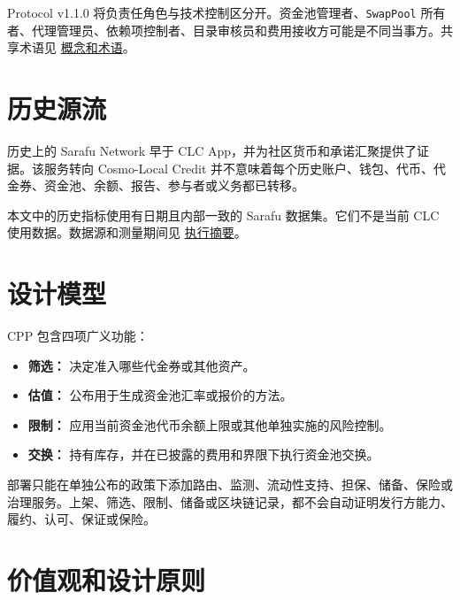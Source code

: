 \documentclass[11pt]{article}
\begin{document}
Protocol v1.1.0 将负责任角色与技术控制区分开。资金池管理者、\texttt{SwapPool} 所有者、代理管理员、依赖项控制者、目录审核员和费用接收方可能是不同当事方。共享术语见 \href{https://docs.cosmolocal.credit/zh/introduction/concepts}{概念和术语}。

\section*{历史源流}

历史上的 Sarafu Network 早于 CLC App，并为社区货币和承诺汇聚提供了证据。该服务转向 Cosmo-Local Credit 并不意味着每个历史账户、钱包、代币、代金券、资金池、余额、报告、参与者或义务都已转移。

本文中的历史指标使用有日期且内部一致的 Sarafu 数据集。它们不是当前 CLC 使用数据。数据源和测量期间见 \href{https://docs.cosmolocal.credit/zh/white-paper/executive-summary}{执行摘要}。

\section*{设计模型}

CPP 包含四项广义功能：

\begin{itemize}[leftmargin=*]
\item \textbf{筛选：} 决定准入哪些代金券或其他资产。
\item \textbf{估值：} 公布用于生成资金池汇率或报价的方法。
\item \textbf{限制：} 应用当前资金池代币余额上限或其他单独实施的风险控制。
\item \textbf{交换：} 持有库存，并在已披露的费用和界限下执行资金池交换。
\end{itemize}
部署只能在单独公布的政策下添加路由、监测、流动性支持、担保、储备、保险或治理服务。上架、筛选、限制、储备或区块链记录，都不会自动证明发行方能力、履约、认可、保证或保险。

\section*{价值观和设计原则}
\end{document}
